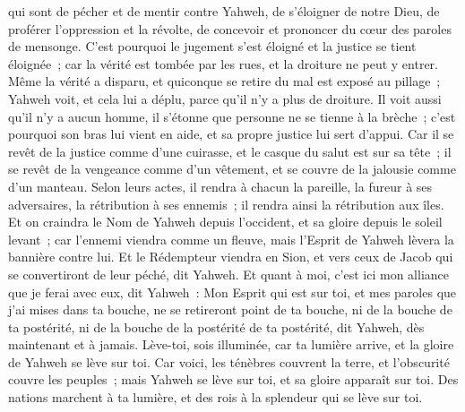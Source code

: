 \begin{multicols}{2}
qui sont de pécher et de mentir contre Yahweh, de s'éloigner de notre Dieu, de proférer l'oppression et la révolte, de concevoir et prononcer du cœur des paroles de mensonge.
C'est pourquoi le jugement s'est éloigné et la justice se tient éloignée~; car la vérité est tombée par les rues, et la droiture ne peut y entrer.
Même la vérité a disparu, et quiconque se retire du mal est exposé au pillage~; Yahweh voit, et cela lui a déplu, parce qu'il n'y a plus de droiture.
Il voit aussi qu'il n'y a aucun homme, il s'étonne que personne ne se tienne à la brèche~; c'est pourquoi son bras lui vient en aide, et sa propre justice lui sert d'appui.
Car il se revêt de la justice comme d'une cuirasse, et le casque du salut est sur sa tête~; il se revêt de la vengeance comme d'un vêtement, et se couvre de la jalousie comme d'un manteau.
Selon leurs actes, il rendra à chacun la pareille, la fureur à ses adversaires, la rétribution à ses ennemis~; il rendra ainsi la rétribution aux îles.
Et on craindra le Nom de Yahweh depuis l'occident, et sa gloire depuis le soleil levant~; car l'ennemi viendra comme un fleuve, mais l'Esprit de Yahweh lèvera la bannière contre lui.
Et le Rédempteur viendra en Sion, et vers ceux de Jacob qui se convertiront de leur péché, dit Yahweh.
Et quant à moi, c'est ici mon alliance que je ferai avec eux, dit Yahweh~: Mon Esprit qui est sur toi, et mes paroles que j'ai mises dans ta bouche, ne se retireront point de ta bouche, ni de la bouche de ta postérité, ni de la bouche de la postérité de ta postérité, dit Yahweh, dès maintenant et à jamais.
\VerseOne{}Lève-toi, sois illuminée, car ta lumière arrive, et la gloire de Yahweh se lève sur toi.
Car voici, les ténèbres couvrent la terre, et l'obscurité couvre les peuples~; mais Yahweh se lève sur toi, et sa gloire apparaît sur toi.
Des nations marchent à ta lumière, et des rois à la splendeur qui se lève sur toi.

\end{multicols}
